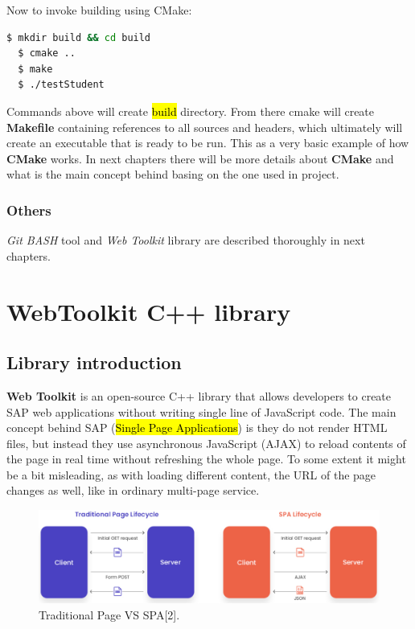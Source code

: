 \documentclass[a4paper,12pt]{article}
\newcommand\tab[1][1cm]{\hspace*{#1}}
\begin{document}
{{\noindent Now to invoke building using CMake:
\begin{lstlisting}[language=bash]
  $ mkdir build && cd build
  $ cmake ..
  $ make
  $ ./testStudent
\end{lstlisting}
  
\bigskip Commands above will create \hl{build} directory. From there cmake will create \textbf{Makefile} containing references to all sources and headers, which ultimately will create an executable that is ready to be run. This as a very basic example of how \textbf{CMake} works. In next chapters there will be more details about \textbf{CMake} and what is the main concept behind basing on the one used in project. 

}

\subsubsection*{Others}
\textit{Git BASH} tool and \textit{Web Toolkit} library are described thoroughly in next chapters.
\newpage

\section{WebToolkit C++ library}
\subsection{Library introduction}
{\tab \textbf{Web Toolkit} is an open-source C++ library that allows developers to create SAP web applications without writing single line of JavaScript code. The main concept behind \cite{singlepageapplications}SAP (\hl{Single Page Applications}) is they do not render HTML files, but instead they use asynchronous JavaScript (AJAX) to reload contents of the page in real time without refreshing the whole page. To some extent it might be a bit misleading, as with loading different content, the URL of the page changes as well, like in ordinary multi-page service.

\begin{figure}[h]
  \centering
    \includegraphics[width=1.0\textwidth]{spa}
    \caption{Traditional Page VS SPA[2].}
\end{figure}

}}
\end{document}
